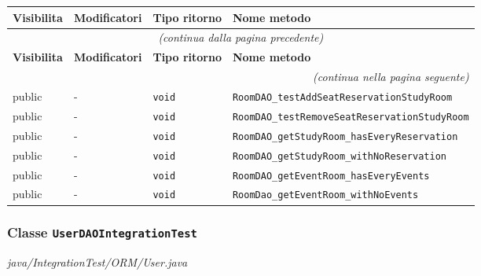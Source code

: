 \begin{longtable}{@{}llll@{}}
\toprule
\textbf{Visibilita} & \textbf{Modificatori} & \textbf{Tipo ritorno} & \textbf{Nome metodo} \\
\midrule
\endfirsthead
\multicolumn{4}{c}{\small\itshape (continua dalla pagina precedente)} \\
\toprule
\textbf{Visibilita} & \textbf{Modificatori} & \textbf{Tipo ritorno} & \textbf{Nome metodo} \\
\midrule
\endhead
\midrule
\multicolumn{4}{r}{\small\itshape (continua nella pagina seguente)} \\
\endfoot
\bottomrule
\endlastfoot
  public & - & \texttt{void} & \texttt{RoomDAO\_testAddSeatReservationStudyRoom} \\
  public & - & \texttt{void} & \texttt{RoomDAO\_testRemoveSeatReservationStudyRoom} \\
  public & - & \texttt{void} & \texttt{RoomDAO\_getStudyRoom\_hasEveryReservation} \\
  public & - & \texttt{void} & \texttt{RoomDAO\_getStudyRoom\_withNoReservation} \\
  public & - & \texttt{void} & \texttt{RoomDAO\_getEventRoom\_hasEveryEvents} \\
  public & - & \texttt{void} & \texttt{RoomDao\_getEventRoom\_withNoEvents} \\
\end{longtable}

\subsubsection*{Classe \texttt{UserDAOIntegrationTest}}\label{UserDAOIntegrationTest}
{\small\textit{java/IntegrationTest/ORM/User.java}}
\vspace{4pt}


